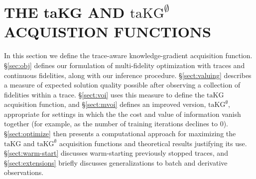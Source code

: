\documentclass[letterpaper]{article}
\newcommand{\taKG}{\text{taKG}}
\newcommand{\taKGE}{\text{taKG}^\emptyset}
\numberwithin{equation}{section}
\let\Section\S
\renewcommand{\S}{\mathcal{S}}
\newcommand{\sectn}[1]{\Section\ref{#1}}
\newcommand{\xxcomment}[4]{\textcolor{#1}{[$^{\textsc{#2}}_{\textsc{#3}}$ #4]}}
\newcommand{\agw}[1]{\xxcomment{red}{A}{W}{#1}}
\begin{document}

\section{THE taKG AND $\taKGE$ ACQUISTION FUNCTIONS}
\label{sect:taKG}
In this section we define the trace-aware knowledge-gradient acquisition function.
\sectn{sec:obj} defines our formulation of multi-fidelity optimization with traces and continuous fidelities, along with our inference procedure.
\sectn{sect:valuing} describes a measure of expected solution quality possible after observing a collection of fidelities within a trace.
\sectn{sect:voi} uses this measure to define the $\taKG$ acquisition function,
and \sectn{sect:mvoi} defines an improved version, $\taKGE$, appropriate for settings in which the 
the cost and value of information vanish together (for example, as the number of training iterations declines to 0).
\sectn{sect:optimize} then presents a computational approach for maximizing the $\taKG$ and $\taKGE$ acquisition functions and theoretical results justifying its use.  \sectn{sect:warm-start} discusses warm-starting previously stopped traces, and \sectn{sect:extensions} briefly discusses generalizations to batch and derivative observations.
\end{document}
